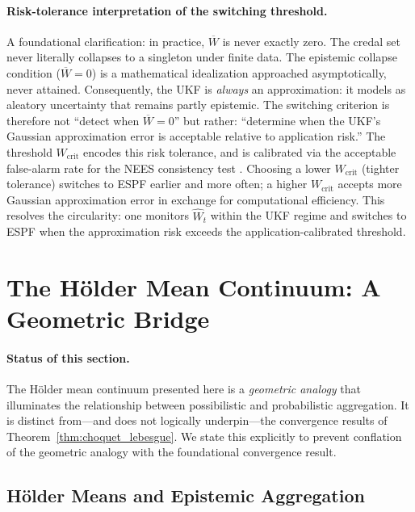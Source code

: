 \documentclass[12pt]{article}
\newcommand{\Wcrit}{W_\mathrm{crit}}
\begin{document}
\paragraph{Risk-tolerance interpretation of the switching threshold.}
A foundational clarification: in practice, $\overline{W}$ is never exactly zero.
The credal set never literally collapses to a singleton under finite data.
The epistemic collapse condition ($\overline{W}=0$) is a mathematical idealization
approached asymptotically, never attained.
Consequently, the UKF is \emph{always} an approximation: it models as aleatory
uncertainty that remains partly epistemic.
The switching criterion is therefore not ``detect when $\overline{W}=0$''
but rather: ``determine when the UKF's Gaussian approximation error is
acceptable relative to application risk.''
The threshold $\Wcrit$ encodes this risk tolerance, and is calibrated via the
acceptable false-alarm rate for the NEES consistency test \cite{bar-shalom2001}.
Choosing a lower $\Wcrit$ (tighter tolerance) switches to ESPF earlier and more
often; a higher $\Wcrit$ accepts more Gaussian approximation error in exchange
for computational efficiency.
This resolves the circularity: one monitors $\widehat{W}_t$ within the UKF
regime and switches to ESPF when the approximation risk exceeds the
application-calibrated threshold.

\section{The H\"older Mean Continuum: A Geometric Bridge}
\label{sec:continuum}

\paragraph{Status of this section.}
The H\"older mean continuum presented here is a \emph{geometric analogy}
that illuminates the relationship between possibilistic and probabilistic
aggregation.
It is distinct from---and does not logically underpin---the convergence
results of Theorem~\ref{thm:choquet_lebesgue}.
We state this explicitly to prevent conflation of the geometric analogy
with the foundational convergence result.

\subsection{H\"older Means and Epistemic Aggregation}
\end{document}
